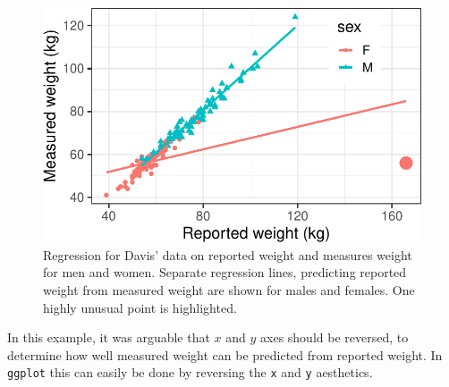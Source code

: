 \documentclass[
  letterpaper,
  10pt,
  krantz2]{krantz}
\makeatletter
\newenvironment{Shaded}{\begin{snugshade}}{\end{snugshade}}
\newcommand{\AttributeTok}[1]{\textcolor[rgb]{0.40,0.45,0.13}{#1}}
\newcommand{\ConstantTok}[1]{\textcolor[rgb]{0.56,0.35,0.01}{#1}}
\newcommand{\DecValTok}[1]{\textcolor[rgb]{0.68,0.00,0.00}{#1}}
\newcommand{\FunctionTok}[1]{\textcolor[rgb]{0.28,0.35,0.67}{#1}}
\newcommand{\NormalTok}[1]{\textcolor[rgb]{0.00,0.23,0.31}{#1}}
\newcommand{\SpecialCharTok}[1]{\textcolor[rgb]{0.37,0.37,0.37}{#1}}
\newcommand{\StringTok}[1]{\textcolor[rgb]{0.13,0.47,0.30}{#1}}
\newenvironment{kframe}{%
  \medskip{}
  \setlength{\fboxsep}{.8em}
  \def\at@end@of@kframe{}%
  \ifinner\ifhmode%
  \def\at@end@of@kframe{\end{minipage}}%
  \begin{minipage}{\columnwidth}%
  \fi\fi%
  \def\FrameCommand##1{\hskip\@totalleftmargin \hskip-\fboxsep
  \colorbox{shadecolor}{##1}\hskip-\fboxsep
      \hskip-\linewidth \hskip-\@totalleftmargin \hskip\columnwidth}%
  \MakeFramed {\advance\hsize-\width
    \@totalleftmargin\z@ \linewidth\hsize
    \@setminipage}}%
{\par\unskip\endMakeFramed%
  \at@end@of@kframe}
\renewenvironment{Shaded}{\begin{kframe}}{\end{kframe}}
\makeatother
\begin{document}
\begin{figure}[H]

{\centering \includegraphics{figs/ch02/fig-ch02-davis-reg1-1.pdf}

}

\caption{\label{fig-ch02-davis-reg1}Regression for Davis' data on
reported weight and measures weight for men and women. Separate
regression lines, predicting reported weight from measured weight are
shown for males and females. One highly unusual point is highlighted.}

\end{figure}

In this example, it was arguable that \(x\) and \(y\) axes should be
reversed, to determine how well measured weight can be predicted from
reported weight. In \texttt{ggplot} this can easily be done by reversing
the \texttt{x} and \texttt{y} aesthetics.

\begin{Shaded}
\end{Shaded}
\end{document}

